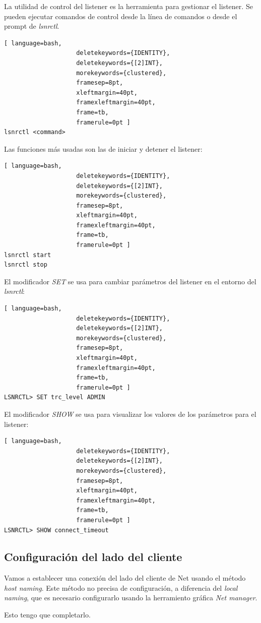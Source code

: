 La utilidad de control del listener es la herramienta para gestionar el listener. Se pueden ejecutar comandos de control desde la línea de comandos o desde el prompt de \textit{lsnrctl}. 
\begin{lstlisting}[ language=bash,
                    deletekeywords={IDENTITY},
                    deletekeywords={[2]INT},
                    morekeywords={clustered},
                    framesep=8pt,
                    xleftmargin=40pt,
                    framexleftmargin=40pt,
                    frame=tb,
                    framerule=0pt ]
lsnrctl <command>
\end{lstlisting}
Las funciones más usadas son las de iniciar y detener el listener:
\begin{lstlisting}[ language=bash,
                    deletekeywords={IDENTITY},
                    deletekeywords={[2]INT},
                    morekeywords={clustered},
                    framesep=8pt,
                    xleftmargin=40pt,
                    framexleftmargin=40pt,
                    frame=tb,
                    framerule=0pt ]
lsnrctl start
lsnrctl stop
\end{lstlisting}
El modificador \textit{SET} se usa para cambiar parámetros del listener en el entorno del \textit{lsnrctl}:
\begin{lstlisting}[ language=bash,
                    deletekeywords={IDENTITY},
                    deletekeywords={[2]INT},
                    morekeywords={clustered},
                    framesep=8pt,
                    xleftmargin=40pt,
                    framexleftmargin=40pt,
                    frame=tb,
                    framerule=0pt ]
LSNRCTL> SET trc_level ADMIN
\end{lstlisting}
El modificador \textit{SHOW} se usa para visualizar los valores de los parámetros para el listener:
\begin{lstlisting}[ language=bash,
                    deletekeywords={IDENTITY},
                    deletekeywords={[2]INT},
                    morekeywords={clustered},
                    framesep=8pt,
                    xleftmargin=40pt,
                    framexleftmargin=40pt,
                    frame=tb,
                    framerule=0pt ]
LSNRCTL> SHOW connect_timeout
\end{lstlisting}

\subsection{Configuración del lado del cliente}

Vamos a establecer una conexión del lado del cliente de Net usando el método \textit{host naming}. Este método no precisa de configuración, a diferencia del \textit{local naming}, que es necesario configurarlo usando la herramiento gráfica \textit{Net manager}.

Esto tengo que completarlo.